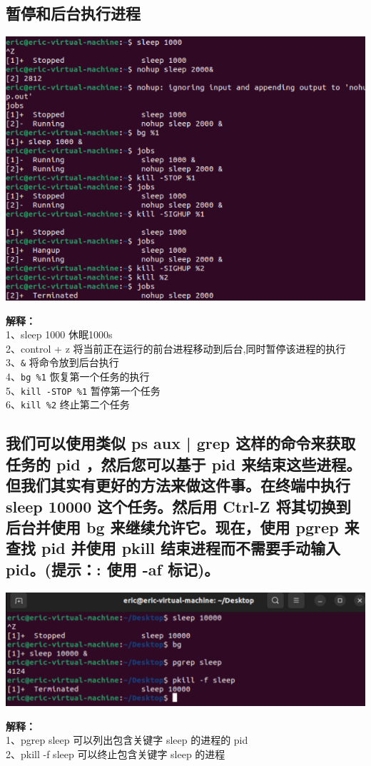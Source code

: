 \documentclass[UTF8,a4paper]{ctexart}
\begin{document}
\subsection{暂停和后台执行进程}
\begin{table}[H]
    \includegraphics[width=1\textwidth]{./命令行/1.png}
\end{table}
\textbf{解释：}\\
1、sleep 1000 休眠1000s\\
2、control + z 将当前正在运行的前台进程移动到后台,同时暂停该进程的执行\\
3、\verb|&| 将命令放到后台执行\\
4、\verb|bg %1| 恢复第一个任务的执行\\
5、\verb|kill -STOP %1| 暂停第一个任务\\
6、\verb|kill %2| 终止第二个任务

\subsection{我们可以使用类似 ps aux | grep 这样的命令来获取任务的 pid ，然后您可以基于 pid 来结束这些进程。但我们其实有更好的方法来做这件事。在终端中执行 sleep 10000 这个任务。然后用 Ctrl-Z 将其切换到后台并使用 bg 来继续允许它。现在，使用 pgrep 来查找 pid 并使用 pkill 结束进程而不需要手动输入 pid。(提示：: 使用 -af 标记)。}
\begin{table}[H]
    \includegraphics[width=1\textwidth]{./命令行/2.png}
\end{table}
\textbf{解释：}\\
1、pgrep sleep 可以列出包含关键字 sleep 的进程的 pid\\
2、pkill -f sleep 可以终止包含关键字 sleep 的进程
\end{document}
